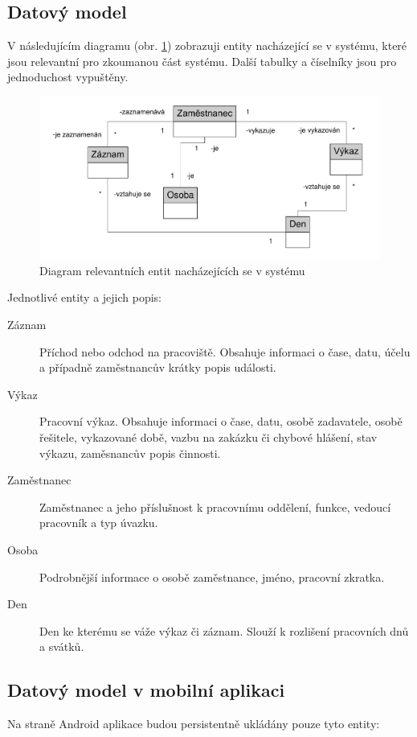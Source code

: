 \documentclass{diplomka}
\begin{document}
\subsection{Datový model}
V následujícím diagramu (obr. \ref{fig:object}) zobrazuji entity nacházející se v systému, které jsou relevantní pro zkoumanou část systému. Další tabulky a číselníky jsou pro jednoduchost vypuštěny.
\begin{figure}[H]
  \centering
  \includegraphics[scale=0.6]{visio/object.pdf}
\caption{Diagram relevantních entit nacházejících se v systému}
\label{fig:object}
\end{figure}
\noindent
Jednotlivé entity a jejich popis:

\begin{description}
\item [Záznam]
Příchod nebo odchod na pracoviště. Obsahuje informaci o čase, datu, účelu a případně zaměstnancův krátky popis události.
\item [Výkaz]
Pracovní výkaz. Obsahuje informaci o čase, datu, osobě zadavatele, osobě řešitele, vykazované době, vazbu na zakázku či chybové hlášení, stav výkazu, zaměsnancův popis činnosti.
\item [Zaměstnanec]
Zaměstnanec a jeho příslušnost k pracovnímu oddělení, funkce, vedoucí pracovník a typ úvazku. 
\item [Osoba]
Podrobnější informace o osobě zaměstnance, jméno, pracovní zkratka.
\item [Den]
Den ke kterému se váže výkaz či záznam. Slouží k rozlišení pracovních dnů a svátků.
\end{description}

\subsection{Datový model v mobilní aplikaci}
Na straně Android aplikace budou persistentně ukládány pouze tyto entity:
\end{document}

